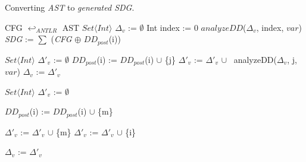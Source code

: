 \begin{algorithm}[!htbp]
%
\small
\label{alg:ASTtoSDG}
    \caption{Converting \emph{AST} to \emph{generated SDG}.}
    \BlankLine
    \BlankLine
    \BlankLine
    CFG $\hookleftarrow_{ANTLR}$ AST\;
    {
        $Set\langle Int \rangle$ $\Delta_{v}$ := $\emptyset$\;
        Int index := 0\;
        $analyzeDD$($\Delta_{v}$, index, $var$)\;
    }
    \emph{SDG} := $\sum$ (\emph{CFG} $\oplus$  $DD_{post}$(i))\;

    {
        {
            {
                $Set\langle Int \rangle$  $\Delta'_{v}$ := $\emptyset$\;
                {
                    {
                        {
                            $DD_{post}$(i) := $DD_{post}$(i) $\cup$ \{j\}\;
                        }
                    }
                    $\Delta'_{v}$ := $\Delta'_{v}$ $\cup$ \ analyzeDD($\Delta_{v}$, j, $var$)\;
                }
                $\Delta_{v}$ := $\Delta'_{v}$\;
            }
            {
                $Set\langle Int \rangle$ $\Delta'_{v}$ := $\emptyset$\;
                {
                    {
                        $DD_{post}$(i) := $DD_{post}$(i) $\cup$ \{m\}\;
                    }

                    {
                        $\Delta'_{v}$ := $\Delta'_{v}$ $\cup$ \{m\}\;
                    }
                    {
                        $\Delta'_{v}$ := $\Delta'_{v}$ $\cup$ \{i\}\;
                    }
                }
                $\Delta_{v}$ := $\Delta'_{v}$\;
            }
        }
    }
\end{algorithm}



